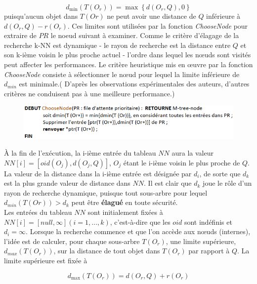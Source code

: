 \begin{equation}
    d_{\min}(T(O_r)) = \max \left\{d(O_r, Q), 0\right\}
\end{equation}
puisqu'aucun objet dans $ T(Or) $ ne peut avoir une distance de $  Q  $ inférieure à $ d(O_r, Q)-r(O_r) $.
Ces limites sont utilisées par la fonction \textit{ChooseNode} pour extraire de $ PR $ le noeud suivant à examiner. Comme le critère d'élagage de la recherche k-NN est dynamique - le rayon de recherche est la distance entre $ Q $ et son k-ième voisin le plus proche actuel - l'ordre dans lequel les nœuds sont visités peut affecter les performances. Le critère heuristique mis en œuvre par la fonction \textit{ChooseNode} consiste à sélectionner le nœud pour lequel la limite inférieure de $ d_{min} $ est minimale.( D'après les observations expérimentales des auteurs, d'autres critères ne conduisent pas à une meilleure performance.)
\begin{figure}[H]
	\centering
	\includegraphics[width=.9 \textwidth]{Figures/choosenode.png} %
\end{figure} 


À la fin de l'exécution, la i-ième entrée du tableau $ NN $ aura la valeur $ NN[i] = [oid(O_j),d(O_j, Q)] $, $ O_j $ étant le i-ième voisin le plus proche de $ Q $. La valeur de la distance dans la i-ième entrée est désignée par $ d_i $, de sorte que $ d_k $ est la plus grande valeur de distance dans $ NN $. Il est clair que $ d_k $ joue le rôle d'un rayon de recherche dynamique, puisque tout sous-arbre pour lequel $ d_{min}(T(Or)) > d_k $ peut être \textbf{élagué} en toute sécurité.\\

Les entrées du tableau $ NN $ sont initialement fixées à $ NN[i] = [null ,\infty] (i= 1,..., k) $, c'est-à-dire que les $ oid $ sont indéfinis et $ d_i = \infty $. Lorsque la recherche commence et que l'on accède aux nœuds (internes), l'idée est de calculer, pour chaque sous-arbre $ T(O_r) $, une limite supérieure, $ d_{max}(T(O_r)) $, sur la distance de tout objet dans $ T(O_r) $ par rapport à $ Q $. La limite supérieure est fixée à

\begin{equation}
d_{\max}(T(O_r)) =  d(O_r, Q)+r(O_r)
\end{equation}


